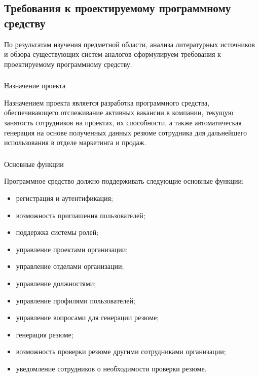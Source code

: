 \subsection{Требования к проектируемому программному средству}
\label{sec:analysis:specification}

По результатам изучения предметной области, анализа литературных источников и обзора существующих систем-аналогов
сформулируем требования к проектируемому программному средству.
\pagebreak

\subsubsection{} Назначение проекта
\label{sec:analysis:specification:purpose}

Назначением проекта является разработка программного средства, обеспечивающего отслеживание
активных вакансии в компании, текущую занятость сотрудников на проектах, их способности, а также автоматическая генерация
на основе полученных данных резюме сотрудника для дальнейшего использования в отделе маркетинга и продаж.

\subsubsection{} Основные функции
\label{sec:analysis:specification:functions}

Программное средство должно поддерживать следующие основные фун\-к\-ции:

\begin{itemize}
	\item регистрация и аутентификация;
	\item возможность приглашения пользователей;
	\item поддержка системы ролей;
	\item управление проектами организации;
	\item управление отделами организации;
	\item управление должностями;
	\item управление профилями пользователей;
	\item управление вопросами для генерации резюме;
	\item генерация резюме;
	\item возможность проверки резюме другими сотрудниками организации;
	\item уведомление сотрудников о необходимости проверки резюме.
\end{itemize}

